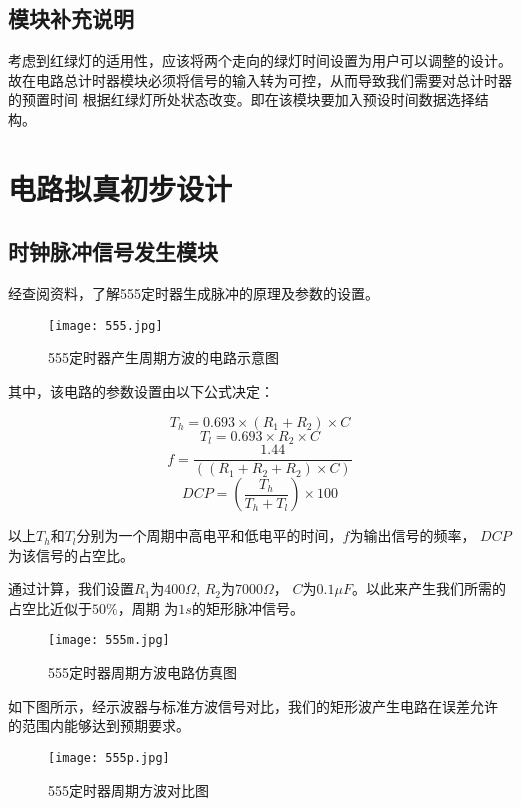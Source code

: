 \documentclass[AutoFakeBold]{LZUThesis}
\begin{document}
\section{模块补充说明}
考虑到红绿灯的适用性，应该将两个走向的绿灯时间设置为用户可以调整的设计。
故在电路总计时器模块必须将信号的输入转为可控，从而导致我们需要对总计时器的预置时间
根据红绿灯所处状态改变。即在该模块要加入预设时间数据选择结构。

\chapter{电路拟真初步设计}

\section{时钟脉冲信号发生模块}
经查阅资料，了解555定时器生成脉冲的原理及参数的设置。
\begin{figure}[htbp]
    \centering
    \texttt{[image: 555.jpg]}
    \caption{555定时器产生周期方波的电路示意图}
\end{figure}

其中，该电路的参数设置由以下公式决定：

\begin{equation}
    T_h=0.693\times (R_1+R_2) \times C
\end{equation}
\begin{equation}
    T_l=0.693\times R_2 \times C
\end{equation}
\begin{equation}
    f=\frac{1.44}{((R_1 + R_2 + R_2) \times C)}
\end{equation}
\begin{equation}
    DCP=(\frac{T_h}{T_h+T_l})\times 100
\end{equation}

以上$T_h$和$T_l$分别为一个周期中高电平和低电平的时间，$f$为输出信号的频率，
$DCP$为该信号的占空比。

通过计算，我们设置$R_1$为$400\Omega$, $R_2$为$7000\Omega $，
$C$为$0.1\mu F$。以此来产生我们所需的占空比近似于$50\%$，周期
为$1s$的矩形脉冲信号。

\begin{figure}[htbp]
    \centering
    \texttt{[image: 555m.jpg]}
    \caption{555定时器周期方波电路仿真图}
\end{figure}
如下图所示，经示波器与标准方波信号对比，我们的矩形波产生电路在误差允许
的范围内能够达到预期要求。
\begin{figure}[htbp]
    \centering
    \texttt{[image: 555p.jpg]}
    \caption{555定时器周期方波对比图}
\end{figure}
\end{document}
